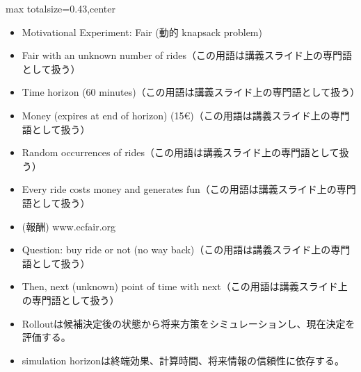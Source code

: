 \clearpage
{}
\begin{minipage}[t]{0.405\textwidth}
\begin{adjustbox}{max totalsize={\textwidth}{0.43\textheight},center}
\begin{minipage}{\textwidth}\scriptsize
{}\begin{itemize}
\item Motivational Experiment: Fair (動的 knapsack problem)
\item Fair with an unknown number of rides（この用語は講義スライド上の専門語として扱う）
\item Time horizon (60 minutes)（この用語は講義スライド上の専門語として扱う）
\item Money (expires at end of horizon) (15€)（この用語は講義スライド上の専門語として扱う）
\item Random occurrences of rides（この用語は講義スライド上の専門語として扱う）
\item Every ride costs money and generates fun（この用語は講義スライド上の専門語として扱う）
\item (報酬) www.ecfair.org
\item Question: buy ride or not (no way back)（この用語は講義スライド上の専門語として扱う）
\item Then, next (unknown) point of time with next（この用語は講義スライド上の専門語として扱う）
\end{itemize}\begin{itemize}
\item Rolloutは候補決定後の状態から将来方策をシミュレーションし、現在決定を評価する。
\item simulation horizonは終端効果、計算時間、将来情報の信頼性に依存する。
\end{itemize}
\end{minipage}
\end{adjustbox}
\end{minipage}\hfill

